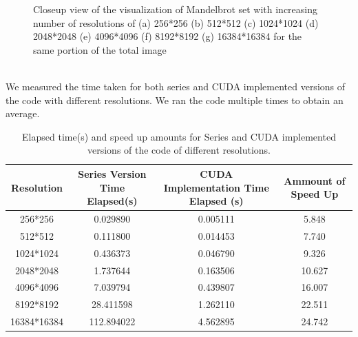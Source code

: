 \documentclass{report}
\begin{document}
\begin{figure}[H]
\begin{center}
\caption{Closeup view of the visualization of Mandelbrot set with increasing number of resolutions of (a) 256*256 (b) 512*512 (c) 1024*1024 (d) 2048*2048 (e) 4096*4096 (f) 8192*8192 (g) 16384*16384 for the same portion of the total image}
\label{fig:res_evo_close}
\end{center}
\end{figure}
\pagebreak
\pagebreak
\\
We measured the time taken for both series and CUDA implemented versions of the code with different resolutions. We ran the code multiple times to obtain an average.
\begin{table}[h]
    \centering
    \hspace*{-3cm}\begin{tabular}{|c|c|c|c|}
        \hline
        Resolution & Series Version Time Elapsed(s) & CUDA Implementation Time Elapsed (s) & Ammount of Speed Up \\
        \hline
        256*256 & 0.029890 &0.005111 & 5.848\\
        \hline
        512*512 & 0.111800 &0.014453 & 7.740\\
        \hline
        1024*1024 & 0.436373 &0.046790 & 9.326\\
        \hline
        2048*2048 & 1.737644 & 0.163506 & 10.627\\
        \hline
        4096*4096 & 7.039794 & 0.439807 & 16.007 \\
        \hline
        8192*8192 & 28.411598 & 1.262110 & 22.511\\
        \hline
        16384*16384 & 112.894022 & 4.562895 & 24.742\\
        \hline
    \end{tabular}
    \caption{Elapsed time(s) and speed up amounts for Series and CUDA implemented versions of the code of different resolutions.}
    \label{table1}
\end{table}
\end{document}
